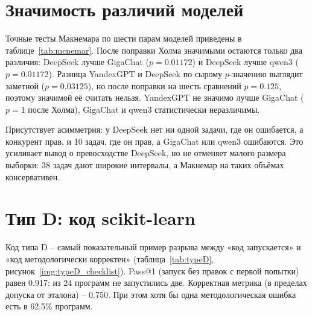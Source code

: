 \documentclass{bmstu}
\begin{document}
\section{Значимость различий моделей}
Точные тесты Макнемара по шести парам моделей приведены в таблице~\ref{tab:mcnemar}. После поправки Холма значимыми остаются только два различия: DeepSeek лучше GigaChat ($p=0.01172$) и DeepSeek лучше qwen3 ($p=0.01172$). Разница YandexGPT и DeepSeek по сырому $p$-значению выглядит заметной ($p=0.03125$), но после поправки на шесть сравнений $p=0.125$, поэтому значимой её считать нельзя. YandexGPT не значимо лучше GigaChat ($p=1$ после Холма), GigaChat и qwen3 статистически неразличимы.

\begin{table}[htbp]
\centering
\caption{Тест Макнемара для пар моделей (точный тест, поправка Холма)}
\label{tab:mcnemar}
\setlength{\tabcolsep}{3pt}
\vspace{-10pt}
\end{table}

Присутствует асимметрия: у DeepSeek нет ни одной задачи, где он ошибается, а конкурент прав, и 10 задач, где он прав, а GigaChat или qwen3 ошибаются. Это усиливает вывод о превосходстве DeepSeek, но не отменяет малого размера выборки: 38 задач дают широкие интервалы, а Макнемар на таких объёмах консервативен.

\section{Тип D: код scikit-learn}
Код типа D -- самый показательный пример разрыва между «код запускается» и «код методологически корректен» (таблица~\ref{tab:typeD}, рисунок~\ref{img:typeD_checklist}). Pass@1 (запуск без правок с первой попытки) равен 0.917: из 24 программ не запустились две. Корректная метрика (в пределах допуска от эталона) -- 0.750. При этом хотя бы одна методологическая ошибка есть в 62.5\% программ.
\end{document}
